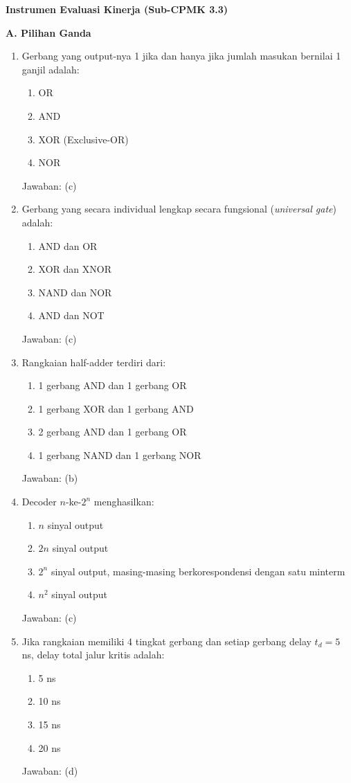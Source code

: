 \documentclass[../main]{subfiles}
\begin{document}
\begin{asesmen}
\textbf{Instrumen Evaluasi Kinerja (Sub-CPMK 3.3)}

\textbf{A. Pilihan Ganda}
\begin{enumerate}
  \item Gerbang yang output-nya 1 jika dan hanya jika jumlah masukan bernilai 1 ganjil adalah:
  \begin{enumerate}
    \item OR
    \item AND
    \item XOR (Exclusive-OR)
    \item NOR
  \end{enumerate}
  Jawaban: (c)

  \item Gerbang yang secara individual lengkap secara fungsional (\textit{universal gate}) adalah:
  \begin{enumerate}
    \item AND dan OR
    \item XOR dan XNOR
    \item NAND dan NOR
    \item AND dan NOT
  \end{enumerate}
  Jawaban: (c)

  \item Rangkaian half-adder terdiri dari:
  \begin{enumerate}
    \item 1 gerbang AND dan 1 gerbang OR
    \item 1 gerbang XOR dan 1 gerbang AND
    \item 2 gerbang AND dan 1 gerbang OR
    \item 1 gerbang NAND dan 1 gerbang NOR
  \end{enumerate}
  Jawaban: (b)

  \item Decoder $n$-ke-$2^n$ menghasilkan:
  \begin{enumerate}
    \item $n$ sinyal output
    \item $2n$ sinyal output
    \item $2^n$ sinyal output, masing-masing berkorespondensi dengan satu minterm
    \item $n^2$ sinyal output
  \end{enumerate}
  Jawaban: (c)

  \item Jika rangkaian memiliki 4 tingkat gerbang dan setiap gerbang delay $t_d = 5$ ns, delay total jalur kritis adalah:
  \begin{enumerate}
    \item 5 ns
    \item 10 ns
    \item 15 ns
    \item 20 ns
  \end{enumerate}
  Jawaban: (d)
\end{enumerate}


\end{asesmen}
\end{document}
